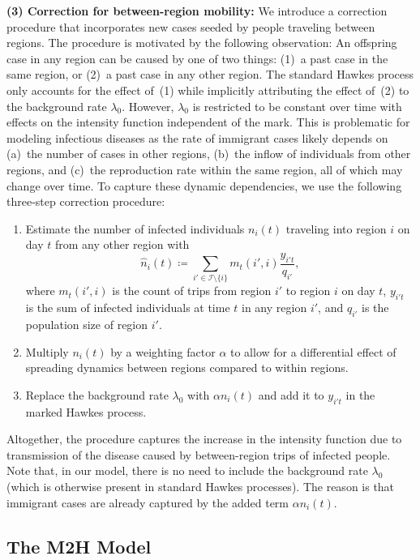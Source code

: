 \documentclass[sigconf, review = false, nonacm = true]{acmart}
\newcommand\modelCapitalized{M2H Model\xspace}
\begin{document}
\textbf{(3) Correction for between-region mobility:} We introduce a correction procedure that incorporates new cases seeded by people traveling between regions. The procedure is motivated by the following observation: An offspring case in any region can be caused by one of two things: (1)~a past case in the same region, or (2)~a past case in any other region. The standard Hawkes process only accounts for the effect of~(1) while implicitly attributing the effect of~(2) to the background rate $\lambda_0$. However, $\lambda_0$ is restricted to be constant over time with effects on the intensity function independent of the mark. This is problematic for modeling infectious diseases as the rate of immigrant cases likely depends on (a)~the number of cases in other regions, (b)~the inflow of individuals from other regions, and (c)~the reproduction rate within the same region, all of which may change over time. To capture these dynamic dependencies, we use the following three-step correction procedure:

\begin{enumerate}
    \item Estimate the number of infected individuals $n_i(t)$ traveling into region $i$ on day $t$ from any other region with
    \begin{equation}
        \label{eq:nc}
        \hat n_i(t) \coloneqq \sum_{i' \in \mathcal I \setminus \{i\}} m_t(i',i) \frac{y_{i't}}{q_{i'}},
    \end{equation}
    where $m_t(i',i)$ is the count of trips from region $i'$ to region $i$ on day $t$, $y_{i't}$ is the sum of infected individuals at time $t$ in any region $i'$, and $q_{i'}$ is the population size of region $i'$.
    \item Multiply $n_i(t)$ by a weighting factor $\alpha$ to allow for a differential effect of spreading dynamics between regions compared to within regions. 
    \item Replace the background rate $\lambda_0$ with $\alpha n_i(t)$ and add it to $y_{i't}$ in the marked Hawkes process.
\end{enumerate}
Altogether, the procedure captures the increase in the intensity function due to transmission of the disease caused by between-region trips of infected people. Note that, in our model, there is no need to include the background rate $\lambda_0$ (which is otherwise present in standard Hawkes processes). The reason is that immigrant cases are already captured by the added term $\alpha n_i(t)$.


\subsection{The \texorpdfstring{\modelCapitalized}{LG}}
\end{document}
